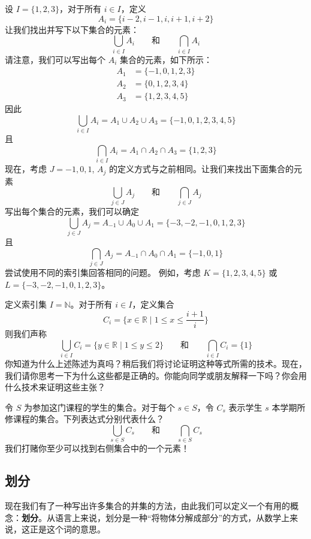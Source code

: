 \begin{example}
    设 $I = \{1, 2, 3\}$，对于所有 $i \in I$，定义
    \[A_i = \{i - 2, i - 1, i, i + 1, i + 2\}\]
    让我们找出并写下以下集合的元素：
    \[\bigcup_{i \in I} A_i \qquad\text{和}\qquad \bigcap_{i \in I} A_i\]
    请注意，我们可以写出每个 $A_i$ 集合的元素，如下所示：
    \begin{align*}
        A_1 &= \{-1, 0, 1, 2, 3\} \\
        A_2 &= \{0, 1, 2, 3, 4\} \\
        A_3 &= \{1, 2, 3, 4, 5\}
    \end{align*}
    因此
    \[\bigcup_{i \in I} A_i = A_1 \cup A_2 \cup A_3 = \{-1, 0, 1, 2, 3, 4, 5\}\]
    且
    \[\bigcap_{i \in I} A_i = A_1 \cap A_2 \cap A_3 = \{1, 2, 3\}\]
    现在，考虑 $J = {-1, 0, 1}$, $A_j$ 的定义方式与之前相同。让我们来找出下面集合的元素
    \[\bigcup_{j \in J} A_j \qquad\text{和}\qquad \bigcap_{j \in J} A_j\]
    写出每个集合的元素，我们可以确定
    \[\bigcup_{j \in J} A_j = A_{-1} \cup A_0 \cup A_1 = \{-3, -2, -1, 0, 1, 2, 3\}\]
    且
    \[\bigcap_{j \in J} A_j = A_{-1} \cap A_0 \cap A_1 = \{-1, 0, 1\}\]
    尝试使用不同的索引集回答相同的问题。
    例如，考虑 $K = \{1, 2, 3, 4, 5\}$ 或 $L = \{-3, -2, -1, 0, 1, 2, 3\}$。
\end{example}

\begin{example}
    定义索引集 $I = \mathbb{N}$。对于所有 $i \in I$，定义集合
    \[C_i = \Bigg\{x \in \mathbb{R} \mid 1 \le x \le \frac{i + 1}{i}\Bigg\}\]
    则我们声称
    \[\bigcup_{i \in I} C_i = \{y \in \mathbb{R} \mid 1 \le y \le 2\} \qquad\text{和}\qquad \bigcap_{i \in I} C_i = \{1\}\]
    你知道为什么上述陈述为真吗？稍后我们将讨论证明这种等式所需的技术。现在，我们请你思考一下为什么这些都是正确的。你能向同学或朋友解释一下吗？你会用什么技术来证明这些主张？ 
\end{example}

\begin{example}
    令 $S$ 为参加这门课程的学生的集合。对于每个 $s \in S$，令 $C_s$ 表示学生 $s$ 本学期所修课程的集合。下列表达式分别代表什么？
    \[\bigcup_{s \in S} C_s \qquad\text{和}\qquad \bigcap_{s \in S} C_s\]
    我们打赌你至少可以找到右侧集合中的一个元素！
\end{example}

\subsection{划分}

现在我们有了一种写出许多集合的并集的方法，由此我们可以定义一个有用的概念：\textbf{划分}。从语言上来说，划分是一种``将物体分解成部分''的方式，从数学上来说，这正是这个词的意思。

